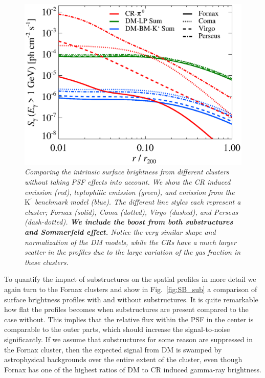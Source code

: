\documentclass[10pt,aps,pra,reprint,amsmath,amsfonts,amssymb,showpacs,nofootinbib,floatfix]{revtex4-1}
\def\C#1{{\bf #1}}
\newcommand{\rmn}{\mathrm}
\newcommand{\Kp}{\rmn{K}^\prime}
\begin{document}
\begin{figure}
 \includegraphics[width=0.99\columnwidth]{figures/SB.v12.1GeV.SF300.SubMass.elmu.eps}
 \caption{\it Comparing the intrinsic surface brightness from
   different clusters without taking PSF effects into account. We show
   the CR induced emission (red), leptophilic emission (green), and
   emission from the $\Kp$ benchmark model (blue). The different line
   styles each represent a cluster; Fornax (solid), Coma (dotted),
   Virgo (dashed), and Perseus (dash-dotted). \C{We include the boost
   from both substructures and Sommerfeld effect.} Notice the very
   similar shape and normalization of the DM models, while the CRs
   have a much larger scatter in the profiles due to the large
   variation of the gas fraction in these clusters.}
 \label{fig:SB_clu}
\end{figure}

To quantify the impact of substructures on the spatial profiles in
more detail we again turn to the Fornax clusters and show in
Fig.~\ref{fig:SB_sub} a comparison of surface brightness profiles with
and without substructures. It is quite remarkable how flat the
profiles becomes when substructures are present compared to the case
without. This implies that the relative flux within the PSF in the
center is comparable to the outer parts, which should increase the
signal-to-noise significantly. If we assume that substructures for
some reason are suppressed in the Fornax cluster, then the expected
signal from DM is swamped by astrophysical backgrounds over the entire
extent of the cluster, even though Fornax has one of the highest
ratios of DM to CR induced gamma-ray brightness.
\end{document}
